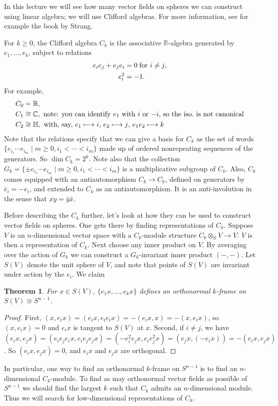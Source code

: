 \documentclass{article}
\newcommand{\C}{\mathbb{C}}
\newcommand{\R}{\mathbb{R}}
\renewcommand{\to}{\longrightarrow}
\renewcommand{\mapsto}{\longmapsto}
\newtheorem{thm}{Theorem}[section]
\theoremstyle{definition}
\begin{document}
In this lecture we will see how many vector fields on spheres we can construct using linear algebra; we will use Clifford algebras.  For more information, see for example the book by Strang.

For $k \ge 0$, the Clifford algebra $C_k$ is the associative $\R$-algebra generated by $e_1, \ldots, e_k$, subject to relations
\begin{align*}
e_i e_j + e_j e_i & = 0 \hbox{\;for $i \ne j$}, \\
e_i^2 & = -1.
\end{align*}
For example,
\begin{align*}
C_0 & = \R, \\
C_1 & \cong \C, \hbox{ note: you can identify $e_1$ with $i$ or $-i$, so the iso.\ is not canonical} \\
C_2 & \cong \mathbb{H}, \hbox{ with, say, $e_1 \mapsto i$, $e_2 \mapsto j$, $e_1 e_2 \mapsto k$}
\end{align*}
Note that the relations specify that we can give a basis for $C_k$ as the set of words $\{e_{i_1} \cdots e_{i_m} \mid m \ge 0, i_1 < \cdots < i_m\}$ made up of ordered nonrepeating sequences of the generators.  So $\dim C_k = 2^k$.  Note also that the collection $G_k = \{ \pm e_{i_1} \cdots e_{i_m} \mid m \ge 0, i_1 < \cdots < i_m\}$ is a multiplicative subgroup of $C_k$.  Also, $C_k$ comes equipped with an antiautomorphism $C_k \to C_k$, defined on generators by $\bar e_i = -e_i$, and extended to $C_k$ as an antiautomorphism.  It is an anti-involution in the sense that $\overline{xy} = \bar y \bar x$.

Before describing the $C_k$ further, let's look at how they can be used to construct vector fields on spheres.  One gets there by finding representations of $C_k$. Suppose $V$ is an $n$-dimensional vector space with a $C_k$-module structure $C_k \otimes_\R V \to V$.  $V$ is then a representation of $C_k$.  Next choose any inner product on $V$.  By averaging over the action of $G_k$ we can construct a $G_k$-invariant inner product $(-, -)$.  Let $S(V)$ denote the unit sphere of $V$, and note that points of $S(V)$ are invariant under action by the $e_i$.  We claim
\begin{thm}
For $x \in S(V)$, $\{e_1 x, \ldots, e_k x\}$ defines an orthonormal $k$-frame on $S(V) \cong S^{n-1}$.
\end{thm}
\begin{proof}
First, $(x, e_i x) = (e_i x, e_i e_i x) = -(e_i x, x) = -(x, e_i x)$, so $(x, e_i x) = 0$ and $e_i x$ is tangent to $S(V)$ at $x$.  Second, if $i \ne j$, we have $(e_i x, e_j x) = (e_i e_j e_i x, e_i e_j e_j x) = (-e_i^2 e_j x, e_i e_j^2 x) = (e_j x, (-e_i x)) = -(e_i x, e_j x)$.  So $(e_i x, e_j x) = 0$, and $e_i x$ and $e_j x$ are orthogonal.
\end{proof}
In particular, one way to find an orthonormal $k$-frame on $S^{n-1}$ is to find an $n$-dimensional $C_k$-module. To find as may orthonormal vector fields as possible of $S^{n-1}$ we should find the largest $k$ such that $C_k$ admits an $n$-dimensional module.
Thus we will search for low-dimensional representations of $C_k$.
\end{document}
